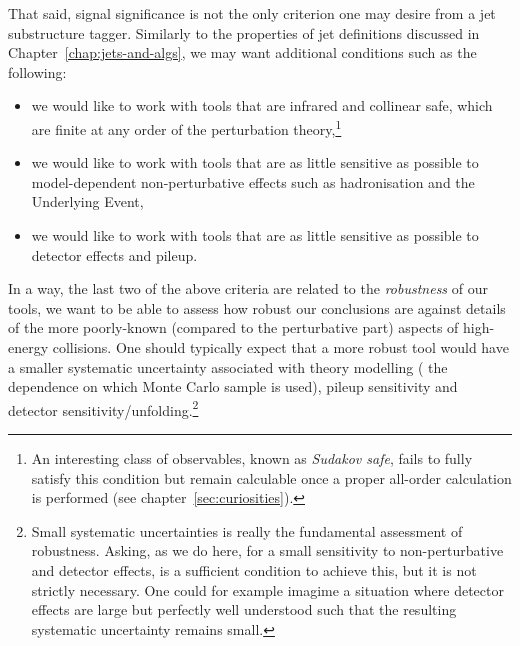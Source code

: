 That said, signal significance is not the only criterion one may
desire from a jet substructure tagger.
%
Similarly to the properties of jet definitions discussed in
Chapter~\ref{chap:jets-and-algs}, we may want additional conditions
such as the following:
\vspace*{-0.2cm}
\begin{itemize}
\itemsep0.0cm
\item we would like to work with tools that are infrared and collinear
  safe, \ie which are finite at any order of the perturbation
  theory,\footnote{An interesting class of observables, known as {\it
      Sudakov safe}, fails to fully satisfy this condition but remain
    calculable once a proper all-order calculation is performed (see
    chapter~\ref{sec:curiosities}).}
\item we would like to work with tools that are as little sensitive as possible to model-dependent
  non-perturbative effects such as hadronisation and the Underlying
  Event,
\item we would like to work with tools that are as little sensitive as possible to
  detector effects and pileup.
\end{itemize}
%
In a way, the last two of the above criteria are related to the {\it
  robustness} of our tools, \ie we want to be able to assess how robust our conclusions are
against details of the more poorly-known (compared to
the perturbative part) aspects of high-energy collisions.
%
One should typically expect that a more robust tool would have a
smaller systematic uncertainty associated with theory modelling (\eg
the dependence on which Monte Carlo sample is used), pileup
sensitivity and detector sensitivity/unfolding.\footnote{Small
  systematic uncertainties is really the fundamental assessment of
  robustness. Asking, as we do here, for a small sensitivity to
  non-perturbative and detector effects, is a sufficient condition to
  achieve this, but it is not strictly necessary. One could for
  example imagime a situation where detector effects are large but
  perfectly well understood such that the resulting systematic
  uncertainty remains small.}

